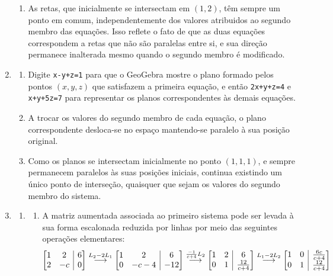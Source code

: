 \documentclass[12pt,a4paper]{article}
\makeatletter
\newenvironment{amatrix}[1]{%
  \left[\begin{array}{@{}*{#1}{c}|c@{}}
}{%
  \end{array}\right]
}
\newcommand{\grstep}[2][\relax]{%
   \ensuremath{\mathrel{
       {\mathop{\longrightarrow}\limits^{#2\mathstrut}_{
                                     \begin{subarray}{l} #1 \end{subarray}}}}}}
\makeatother
\begin{document}
\begin{enumerate}
\begin{enumerate}
\item As retas, que inicialmente se intersectam em $(1,2)$, têm sempre um ponto em comum, independentemente dos valores atribuidos ao segundo membro das equações. Isso reflete o fato de que as duas equações correspondem a retas que não são paralelas entre si, e sua direção permanece inalterada mesmo quando o segundo membro é modificado.
\end{enumerate}


\item 
\begin{enumerate}
\item Digite \texttt{x-y+z=1} para que o GeoGebra mostre o plano formado pelos pontos $(x,y,z)$ que satisfazem a primeira equação, e então \texttt{2x+y+z=4} e \texttt{x+y+5z=7} para representar os planos correspondentes às demais equações.
\item A trocar os valores do segundo membro de cada equação, o plano correspondente desloca-se no espaço mantendo-se paralelo à sua posição original.

\item Como os planos se intersectam inicialmente no ponto $(1,1,1)$, e sempre permanecem paralelos às suas posições iniciais, continua existindo um único ponto de interseção, quaisquer que sejam os valores do segundo membro do sistema.
\end{enumerate}

\item
\begin{enumerate}
\item
\begin{enumerate}
\item A matriz aumentada associada ao primeiro sistema pode ser levada à sua forma escalonada reduzida por linhas por meio das seguintes operações elementares:
\[
\begin{amatrix}{2}
1 & 2 & 6 \\
2 & -c & 0
\end{amatrix}
\grstep{ L_2 - 2 L_1 }
\begin{amatrix}{2}
1 & 2 & 6 \\
0 & -c-4 & -12
\end{amatrix}
\grstep{ \frac{-1}{c+4} L_2 }
\begin{amatrix}{2}
1 & 2 & 6 \\
0 & 1 & \frac{12}{c+4}
\end{amatrix}
\grstep{ L_1 - 2 L_2 }
\begin{amatrix}{2}
1 & 0 & \frac{6c}{c+4} \\
0 & 1 & \frac{12}{c+4}
\end{amatrix}
\]


\end{enumerate}
\end{enumerate}
\end{enumerate}
\end{document}
